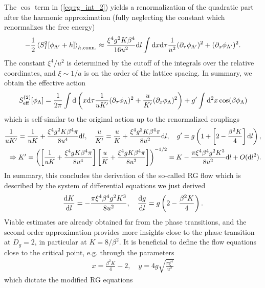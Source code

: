 The $\cos$ term in (\cref{eq:rg_int_2}) yields a renormalization of the quadratic part after the harmonic approximation (fully neglecting the constant which renormalizes the free energy)
\begin{align}
    -\frac12\braket{S^2_I[\phi_{\Lambda'}+h]}_{h,{\rm conn.}}
    \approx
    \frac{\xi^4 g^2K\beta^4}{16u^2}\mathrm d l\int\mathrm d x\mathrm d\tau\frac1{u^2}(\partial_
    \tau\phi_{\Lambda'})^2+(\partial_x\phi_{\Lambda'})^2.
    \label{eq:RG_second_order_approximation}
\end{align}
The constant $\xi^4/u^2$ is determined by the cutoff of the integrals over the relative coordinates, and $\xi\sim1/a$ is on the order of the lattice spacing.
In summary, we obtain the effective action
\begin{align}
    S_{\rm eff}^{(2)}[\phi_\Lambda] = \frac1{2\pi}\int\mathrm d\left(  x\mathrm d\tau\frac{1}{uK'}(\partial_\tau\phi_\Lambda)^2 + \frac{u}{K'}(\partial_x\phi_\Lambda)^2 \right) +  g'\int\mathrm d^2 x\cos(\beta\phi_\Lambda)
\end{align}
which is self-similar to the original action up to the renormalized couplings
\begin{align}
    \frac1{uK'}=\frac1{uK}+\frac{\xi^4 g^2 K\beta^4\pi}{8 u^4}\mathrm d l,
    \quad
    \frac u{K'}=\frac u{K}+\frac{\xi^4 g^2 K\beta^4\pi}{8u^2}\mathrm d l,
    \quad
    g' = g\left( 1 + \left[ 2-\frac{\beta^2 K}4 \right]\mathrm d l \right),
    \\
    \Rightarrow
    K' = \left( \left[ \frac{1}{uK}+\frac{\xi^4 g K\beta^4\pi}{8u^4} \right]\left[ \frac{u}{K}+\frac{\xi^4 g K\beta^4\pi}{8u^2} \right] \right)^{-1/2}
    =
    K-\frac{\pi \xi^4 \beta^4 g^2 K^3}{8u^2}\mathrm d l + O(\mathrm d l^2).
\end{align}
In summary, this concludes the derivation of the so-called RG flow which is described by the system of differential equations we just derived
\begin{align}
    \frac{\mathrm d K}{\mathrm d l} = -\frac{\pi \xi^4 \beta^4 g^2 K^3}{8u^2},
    \quad
    \frac{\mathrm d g}{\mathrm d l} = g\left( 2-\frac{\beta^2K}4 \right).
\end{align}
Viable estimates are already obtained far from the phase transitions, and the second order approximation provides more insights close to the phase transition at $D_g=2$, in particular at $K=8/\beta^2$.
It is beneficial to define the flow equations close to the critical point, e.g. through the parameters
\begin{align}
    x = \frac{\beta^2 K}4 - 2,
    \quad
    y = 4g\sqrt{\frac{\pi\xi^4}{u^2}}
\end{align}
which dictate the modified RG equations
